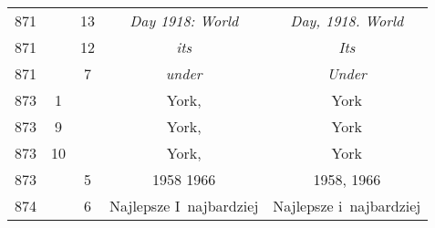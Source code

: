 \documentclass[a4paper,11pt]{article}
\begin{document}
\begin{center}
\begin{tabular}{|c|c|c|c|c|}
    871 & & 13 & \textit{Day 1918: World} & \textit{Day, 1918. World} \\
    871 & & 12 & \textit{its} & \textit{Its} \\
    871 & &  7 & \textit{under} & \textit{Under} \\
    873 &  1 & & York, & York \\
    873 &  9 & & York, & York \\
    873 & 10 & & York, & York \\
    873 & &  5 & 1958 1966 & 1958, 1966 \\
    874 & &  6 & Najlepsze I~najbardziej & Najlepsze i~najbardziej \\
    \hline
  \end{tabular}

\end{center}
\end{document}
